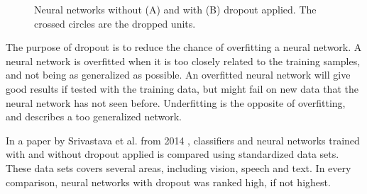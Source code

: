 \begin{figure}[H]
\begin{subfigure}{1\textwidth}
    \caption{}
    \label{fig:net_with_dropout}
    \end{subfigure}
\caption{Neural networks without (A) and with (B) dropout applied. The crossed circles are the dropped units.}
\label{fig:dropout_comparison}
\end{figure}

The purpose of dropout is to reduce the chance of overfitting a neural network. A neural network is overfitted when it is too closely related to the training samples, and not being as generalized as possible. An overfitted neural network will give good results if tested with the training data, but might fail on new data that the neural network has not seen before. Underfitting is the opposite of overfitting, and describes a too generalized network.

In a paper by Srivastava et al. from 2014 \cite{srivastava_dropout:_2014}, classifiers and neural networks trained with and without dropout applied is compared using standardized data sets. These data sets covers several areas, including vision, speech and text. In every comparison, neural networks with dropout was ranked high, if not highest.

